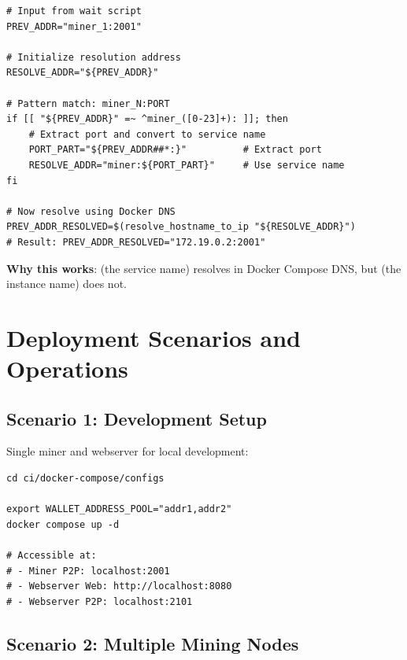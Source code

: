\begin{listing}[htbp]
\caption{Instance Name to Service Name Conversion}
\label{lst:ch22-dns-conversion}
\begin{verbatim}
# Input from wait script
PREV_ADDR="miner_1:2001"

# Initialize resolution address
RESOLVE_ADDR="${PREV_ADDR}"

# Pattern match: miner_N:PORT
if [[ "${PREV_ADDR}" =~ ^miner_([0-23]+): ]]; then
    # Extract port and convert to service name
    PORT_PART="${PREV_ADDR##*:}"          # Extract port
    RESOLVE_ADDR="miner:${PORT_PART}"     # Use service name
fi

# Now resolve using Docker DNS
PREV_ADDR_RESOLVED=$(resolve_hostname_to_ip "${RESOLVE_ADDR}")
# Result: PREV_ADDR_RESOLVED="172.19.0.2:2001"
\end{verbatim}
\end{listing}

\textbf{Why this works}:  (the service name) resolves in Docker Compose DNS, but  (the instance name) does not.

\section{Deployment Scenarios and Operations}
\label{sec:docker-scenarios}

\subsection{Scenario 1: Development Setup}

Single miner and webserver for local development:

\begin{listing}[htbp]
\caption{Single Miner + Webserver Deployment}
\label{lst:ch22-scenario-dev}
\begin{verbatim}
cd ci/docker-compose/configs

export WALLET_ADDRESS_POOL="addr1,addr2"
docker compose up -d

# Accessible at:
# - Miner P2P: localhost:2001
# - Webserver Web: http://localhost:8080
# - Webserver P2P: localhost:2101
\end{verbatim}
\end{listing}

\subsection{Scenario 2: Multiple Mining Nodes}

